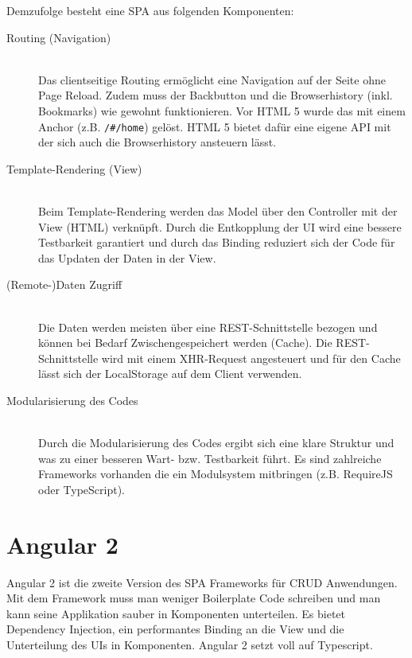 Demzufolge besteht eine SPA aus folgenden Komponenten:
\begin{description}
	\item[Routing (Navigation)] \hfil \\
	Das clientseitige Routing ermöglicht eine Navigation auf der Seite ohne Page Reload. Zudem muss der Backbutton und die Browserhistory (inkl. Bookmarks) wie gewohnt funktionieren. Vor HTML 5 wurde das mit einem Anchor (z.B. \lstinline|/#/home|) gelöst. HTML 5 bietet dafür eine eigene API mit der sich auch die Browserhistory ansteuern lässt.
	\item[Template-Rendering (View)] \hfil \\
	Beim Template-Rendering werden das Model über den Controller mit der View (HTML) verknüpft. Durch die Entkopplung der UI wird eine bessere Testbarkeit garantiert und durch das Binding reduziert sich der Code für das Updaten der Daten in der View.
	\item[(Remote-)Daten Zugriff] \hfil \\
	Die Daten werden meisten über eine REST-Schnittstelle bezogen und können bei Bedarf Zwischengespeichert werden (Cache). Die REST-Schnittstelle wird mit einem XHR-Request angesteuert und für den Cache lässt sich der LocalStorage auf dem Client verwenden.
	\item[Modularisierung des Codes] \hfil \\
	Durch die Modularisierung des Codes ergibt sich eine klare Struktur und was zu einer besseren Wart- bzw. Testbarkeit führt. Es sind zahlreiche Frameworks vorhanden die ein Modulsystem mitbringen (z.B. RequireJS oder TypeScript).
\end{description}

\section{Angular 2}

Angular 2 ist die zweite Version des SPA Frameworks für CRUD Anwendungen. Mit dem Framework muss man weniger Boilerplate Code schreiben und man kann seine Applikation sauber in Komponenten unterteilen. Es bietet Dependency Injection, ein performantes Binding an die View und die Unterteilung des UIs in Komponenten. Angular 2 setzt voll auf Typescript.

